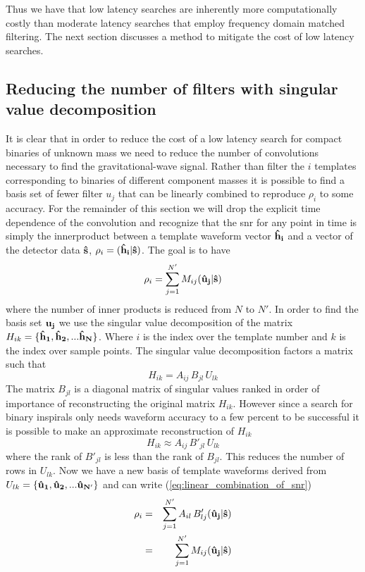 Thus we have that low latency searches are inherently more computationally
costly than moderate latency searches that employ frequency domain matched
filtering.  The next section discusses a method to mitigate the cost of
low latency searches. 

\subsection{Reducing the number of filters with singular value decomposition}
It is clear that in order to reduce the cost of a low latency search for
compact binaries of unknown mass we need to reduce the number of convolutions
necessary to find the gravitational-wave signal.  Rather than filter the
$i$ templates corresponding to binaries of different component masses it is
possible to find a basis set of fewer filter $u_j$ that can be linearly combined
to reproduce $\rho_i$ to some accuracy.  For the remainder of this section
we will drop the explicit time dependence of the convolution and recognize
that the snr for any point in time is simply the innerproduct between a
template waveform vector ${\bf \hat{h}_i}$ and a vector of the detector data 
${\bf \hat{s}}$, $\rho_i = ({\bf \hat{h}_i}|{\bf \hat{s}})$.  
The goal is to have
\begin{equation}
\label{eq:linear_combination_of_snr}
\rho_i = \sum_{j=1}^{N'} M_{ij} ({\bf \hat{u}_j}|{\bf \hat{s}})
\end{equation}
where the number of inner products is reduced from $N$ to $N'$. In order to
find the basis set ${\bf u_j}$ we use the singular value decomposition of
the matrix 
${H_{ik}} = \{{\bf \hat{h}_1}, {\bf \hat{h}_2}, ...{\bf \hat{h}_N}\}$. Where
$i$ is the index over the template number and $k$ is the index over sample 
points. The singular value decomposition factors a matrix such that
\begin{equation}
\label{eq:svd}
{H_{ik}} = {A_{ij}\,B_{jl}\,U_{lk}}
\end{equation}
The matrix ${B_{jl}}$ is a diagonal matrix of singular values ranked in
order of importance of reconstructing the original matrix ${H_{ik}}$.
However since a search for binary inspirals only needs  waveform accuracy to a
few percent to be successful it is possible to make an approximate 
reconstruction of ${H_{ik}}$ 
\begin{equation}
\label{eq:svdapprox}
{H_{ik}} \approx {A_{ij}\,B'_{jl}\,U_{lk}}
\end{equation}
where the rank of ${B'_{jl}}$ is less than the rank of ${B_{jl}}$.
This reduces the number of rows in ${U_{lk}}$.  Now we have a 
new basis of template waveforms derived from ${U_{lk}} = \{{\bf \hat{u}_1}, {\bf \hat{u}_2}, ...{\bf \hat{u}_{N'}}\}$ and can write 
(\ref{eq:linear_combination_of_snr})
\begin{eqnarray}
\label{eq:svdsnr}
\rho_i &=& \sum_{j=1}^{N'} A_{il}\,B'_{lj} ({\bf \hat{u}_j}|{\bf \hat{s}}) \nonumber \\
       &=& \sum_{j=1}^{N'} M_{ij} ({\bf \hat{u}_j}|{\bf \hat{s}})
\end{eqnarray}


